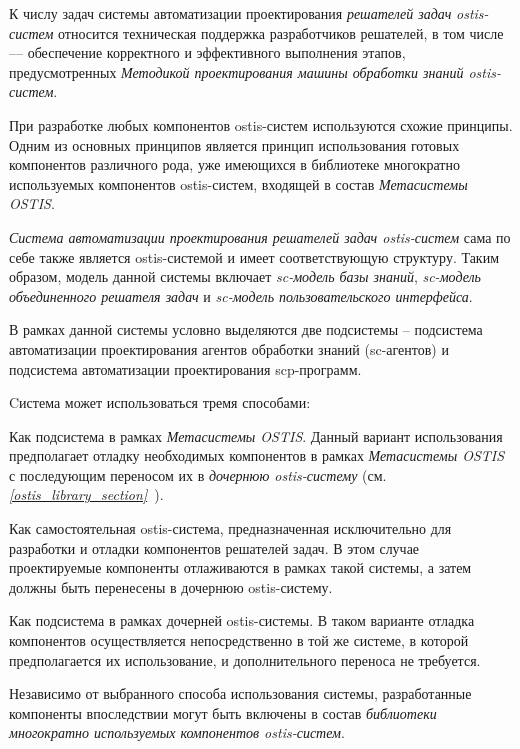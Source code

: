 К числу задач системы автоматизации проектирования \textit{решателей задач} \textit{ostis-систем} относится техническая поддержка разработчиков решателей, в том числе --- обеспечение корректного и эффективного выполнения этапов, предусмотренных \textit{Методикой проектирования машины обработки знаний ostis-систем}.

При разработке любых компонентов ostis-систем используются схожие принципы. Одним из основных принципов является принцип использования готовых компонентов различного рода, уже имеющихся в библиотеке многократно используемых компонентов ostis-систем, входящей в состав \textit{Метасистемы OSTIS}.

\textit{Система автоматизации проектирования решателей задач ostis-систем} сама по себе также является ostis-системой и имеет соответствующую структуру. Таким образом, модель данной системы включает \textit{sc-модель базы знаний}, \textit{sc-модель объединенного решателя задач} и \textit{sc-модель пользовательского интерфейса}.

В рамках данной системы условно выделяются две подсистемы -- подсистема автоматизации проектирования агентов обработки знаний (sc-агентов) и подсистема автоматизации проектирования scp-программ.

Cистема может использоваться тремя способами:
\begin{textitemize}
    \item Как подсистема в рамках \textit{Метасистемы OSTIS}. Данный вариант использования предполагает отладку необходимых компонентов в рамках \textit{Метасистемы OSTIS} с последующим переносом их в \textit{дочернюю ostis-систему} (см. \textit{\ref{ostis_library_section}~}).
    \item Как самостоятельная ostis-система, предназначенная исключительно для разработки и отладки компонентов решателей задач. В этом случае проектируемые компоненты отлаживаются в рамках такой системы, а затем должны быть перенесены в дочернюю ostis-систему.
    \item Как подсистема в рамках дочерней ostis-системы. В таком варианте отладка компонентов осуществляется непосредственно в той же системе, в которой предполагается их использование, и дополнительного переноса не требуется.
\end{textitemize}

Независимо от выбранного способа использования системы, разработанные компоненты впоследствии могут быть включены в состав \textit{библиотеки многократно используемых компонентов ostis-систем}.

